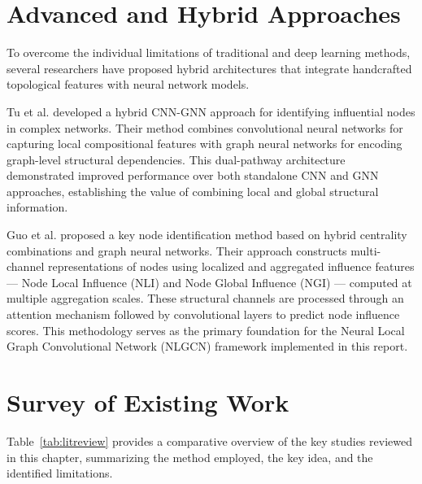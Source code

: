 \section{Advanced and Hybrid Approaches}

To overcome the individual limitations of traditional and deep learning methods, several researchers have proposed hybrid architectures that integrate handcrafted topological features with neural network models.

Tu et al. \cite{tu2025} developed a hybrid CNN-GNN approach for identifying influential nodes in complex networks. Their method combines convolutional neural networks for capturing local compositional features with graph neural networks for encoding graph-level structural dependencies. This dual-pathway architecture demonstrated improved performance over both standalone CNN and GNN approaches, establishing the value of combining local and global structural information.

Guo et al. \cite{guo2026} proposed a key node identification method based on hybrid centrality combinations and graph neural networks. Their approach constructs multi-channel representations of nodes using localized and aggregated influence features --- Node Local Influence (NLI) and Node Global Influence (NGI) --- computed at multiple aggregation scales. These structural channels are processed through an attention mechanism followed by convolutional layers to predict node influence scores. This methodology serves as the primary foundation for the Neural Local Graph Convolutional Network (NLGCN) framework implemented in this report.

\section{Survey of Existing Work}

Table~\ref{tab:litreview} provides a comparative overview of the key studies reviewed in this chapter, summarizing the method employed, the key idea, and the identified limitations.

